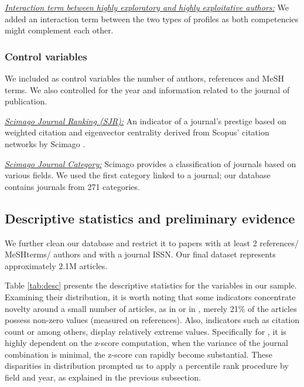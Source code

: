 \noindent\textit{\underline{Interaction term between highly exploratory and  highly exploitative authors:}}
We added an interaction term between the two types of profiles as both competencies might complement each other.

\subsubsection*{Control variables}

We included as control variables the number of authors, references and MeSH terms. We also controlled for the year and information related to the journal of publication.\newline


\noindent\textit{\underline{Scimago Journal Ranking (SJR):}}
An indicator of a journal's prestige based on weighted citation and eigenvector centrality derived from Scopus' citation networks by Scimago \citep{gonzalez2009sjr}. \newline

\noindent\textit{\underline{Scimago Journal Category:}}
Scimago provides a classification of journals based on various fields. We used the first category linked to a journal; our database contains journals from 271 categories. 

\subsection{Descriptive statistics and preliminary evidence}
        
We further clean our database and restrict it to papers with at least 2 references/ MeSHterms/ authors and with a journal ISSN. Our final dataset represents approximately 2.1M articles. 

Table \ref{tab:desc} presents the descriptive statistics for the variables in our sample. Examining their distribution, it is worth noting that some indicators concentrate novelty around a small number of articles, as in \cite{foster2015tradition} or in \cite{wang2017bias}, merely 21\% of the articles possess non-zero values (measured on references). Also, indicators such as citation count or \cite{uzzi2013atypical} among others, display relatively extreme values. Specifically for \cite{uzzi2013atypical}, it is highly dependent on the z-score computation, when the variance of the journal combination is minimal, the z-score can rapidly become substantial. These disparities in distribution prompted us to apply a percentile rank procedure by field and year, as explained in the previous subsection. 


